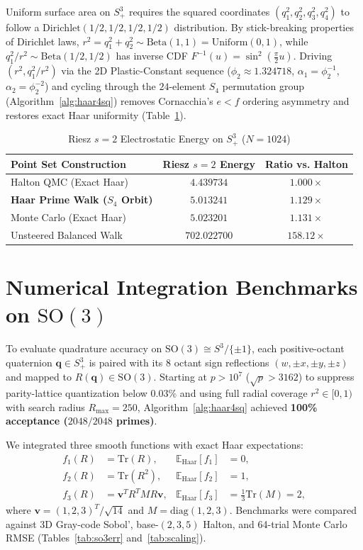 \documentclass[conference]{IEEEtran}
\begin{document}
Uniform surface area on $S^3_+$ requires the squared coordinates $(q_1^2, q_2^2, q_3^2, q_4^2)$ to follow a $\mathrm{Dirichlet}(1/2, 1/2, 1/2, 1/2)$ distribution. By stick-breaking properties of Dirichlet laws, $r^2 = q_1^2 + q_2^2 \sim \mathrm{Beta}(1, 1) = \mathrm{Uniform}(0, 1)$, while $q_1^2 / r^2 \sim \mathrm{Beta}(1/2, 1/2)$ has inverse CDF $F^{-1}(u) = \sin^2(\frac{\pi}{2} u)$. Driving $(r^2, q_1^2/r^2)$ via the 2D Plastic-Constant sequence ($\phi_2 \approx 1.324718$, $\alpha_1 = \phi_2^{-1}$, $\alpha_2 = \phi_2^{-2}$) and cycling through the $24$-element $S_4$ permutation group (Algorithm~\ref{alg:haar4sq}) removes Cornacchia's $e < f$ ordering asymmetry and restores exact Haar uniformity (Table~\ref{tab:riesz}).

\begin{table}[t]
\caption{Riesz $s=2$ Electrostatic Energy on $S^3_+$ ($N = 1024$)}
\label{tab:riesz}
\centering
\begin{tabular}{@{}lcc@{}}
\toprule
\textbf{Point Set Construction} & \textbf{Riesz $s=2$ Energy} & \textbf{Ratio vs. Halton} \\
\midrule
Halton QMC (Exact Haar) & $4.439734$ & $1.000\times$ \\
\textbf{Haar Prime Walk ($S_4$ Orbit)} & $\mathbf{5.013241}$ & $\mathbf{1.129\times}$ \\
Monte Carlo (Exact Haar) & $5.023201$ & $1.131\times$ \\
Unsteered Balanced Walk & $702.022700$ & $158.12\times$ \\
\bottomrule
\end{tabular}
\end{table}

\section{Numerical Integration Benchmarks on $\mathrm{SO}(3)$}
To evaluate quadrature accuracy on $\mathrm{SO}(3) \cong S^3 / \{\pm 1\}$, each positive-octant quaternion $\mathbf{q} \in S^3_+$ is paired with its 8 octant sign reflections $(w, \pm x, \pm y, \pm z)$ and mapped to $R(\mathbf{q}) \in \mathrm{SO}(3)$. Starting at $p > 10^7$ ($\sqrt{p} > 3162$) to suppress parity-lattice quantization below $0.03\%$ and using full radial coverage $r^2 \in [0, 1)$ with search radius $R_{\max} = 250$, Algorithm~\ref{alg:haar4sq} achieved \textbf{100\% acceptance ($2048/2048$ primes)}.

We integrated three smooth functions with exact Haar expectations:
\begin{align}
f_1(R) &= \mathrm{Tr}(R), & \mathbb{E}_{\text{Haar}}[f_1] &= 0, \\
f_2(R) &= \mathrm{Tr}(R^2), & \mathbb{E}_{\text{Haar}}[f_2] &= 1, \\
f_3(R) &= \mathbf{v}^T R^T M R \mathbf{v}, & \mathbb{E}_{\text{Haar}}[f_3] &= \frac{1}{3}\mathrm{Tr}(M) = 2,
\end{align}
where $\mathbf{v} = (1, 2, 3)^T/\sqrt{14}$ and $M = \mathrm{diag}(1, 2, 3)$. Benchmarks were compared against 3D Gray-code Sobol', base-$(2,3,5)$ Halton, and 64-trial Monte Carlo RMSE (Tables~\ref{tab:so3err} and~\ref{tab:scaling}).
\end{document}
